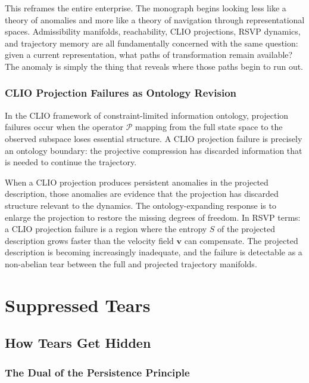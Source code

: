 \documentclass[12pt,oneside]{book}
\theoremstyle{plain}
\theoremstyle{definition}
\theoremstyle{remark}
\newcommand{\1}{\mathbf{1}}
\begin{document}
This reframes the entire enterprise. The monograph begins looking less like a theory of anomalies and more like a theory of navigation through representational spaces. Admissibility manifolds, reachability, CLIO projections, RSVP dynamics, and trajectory memory are all fundamentally concerned with the same question: given a current representation, what paths of transformation remain available? The anomaly is simply the thing that reveals where those paths begin to run out.

\section{CLIO Projection Failures as Ontology Revision}

In the CLIO framework of constraint-limited information ontology, projection failures occur when the operator $\mathcal{P}$ mapping from the full state space to the observed subspace loses essential structure. A CLIO projection failure is precisely an ontology boundary: the projective compression has discarded information that is needed to continue the trajectory.

When a CLIO projection produces persistent anomalies in the projected description, those anomalies are evidence that the projection has discarded structure relevant to the dynamics. The ontology-expanding response is to enlarge the projection to restore the missing degrees of freedom. In RSVP terms: a CLIO projection failure is a region where the entropy $S$ of the projected description grows faster than the velocity field $\mathbf{v}$ can compensate. The projected description is becoming increasingly inadequate, and the failure is detectable as a non-abelian tear between the full and projected trajectory manifolds.

\part{Suppressed Tears}

\chapter{How Tears Get Hidden}

\section{The Dual of the Persistence Principle}
\end{document}
